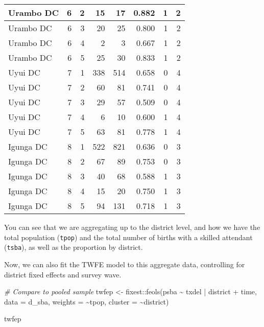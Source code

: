 \documentclass[
]{article}
\newenvironment{Shaded}{\begin{snugshade}}{\end{snugshade}}
\newcommand{\AttributeTok}[1]{\textcolor[rgb]{0.77,0.63,0.00}{#1}}
\newcommand{\CommentTok}[1]{\textcolor[rgb]{0.56,0.35,0.01}{\textit{#1}}}
\newcommand{\FunctionTok}[1]{\textcolor[rgb]{0.00,0.00,0.00}{#1}}
\newcommand{\NormalTok}[1]{#1}
\newcommand{\OtherTok}[1]{\textcolor[rgb]{0.56,0.35,0.01}{#1}}
\newcommand{\SpecialCharTok}[1]{\textcolor[rgb]{0.00,0.00,0.00}{#1}}
\begin{document}
\begin{table}
\begin{tabular}[t]{l|r|r|r|r|r|r|r}
\hline
Urambo DC & 6 & 2 & 15 & 17 & 0.882 & 1 & 2\\
\hline
Urambo DC & 6 & 3 & 20 & 25 & 0.800 & 1 & 2\\
\hline
Urambo DC & 6 & 4 & 2 & 3 & 0.667 & 1 & 2\\
\hline
Urambo DC & 6 & 5 & 25 & 30 & 0.833 & 1 & 2\\
\hline
Uyui DC & 7 & 1 & 338 & 514 & 0.658 & 0 & 4\\
\hline
Uyui DC & 7 & 2 & 60 & 81 & 0.741 & 0 & 4\\
\hline
Uyui DC & 7 & 3 & 29 & 57 & 0.509 & 0 & 4\\
\hline
Uyui DC & 7 & 4 & 6 & 10 & 0.600 & 1 & 4\\
\hline
Uyui DC & 7 & 5 & 63 & 81 & 0.778 & 1 & 4\\
\hline
Igunga DC & 8 & 1 & 522 & 821 & 0.636 & 0 & 3\\
\hline
Igunga DC & 8 & 2 & 67 & 89 & 0.753 & 0 & 3\\
\hline
Igunga DC & 8 & 3 & 40 & 68 & 0.588 & 1 & 3\\
\hline
Igunga DC & 8 & 4 & 15 & 20 & 0.750 & 1 & 3\\
\hline
Igunga DC & 8 & 5 & 94 & 131 & 0.718 & 1 & 3\\
\hline
\end{tabular}
\end{table}

You can see that we are aggregating up to the district level, and how we
have the total population (\texttt{tpop}) and the total number of births
with a skilled attendant (\texttt{tsba}), as well as the proportion by
district.

Now, we can also fit the TWFE model to this aggregate data, controlling
for district fixed effects and survey wave.

\begin{Shaded}
\begin{Highlighting}[]
\CommentTok{\# Compare to pooled sample}
\NormalTok{twfep }\OtherTok{\textless{}{-}}\NormalTok{ fixest}\SpecialCharTok{::}\FunctionTok{feols}\NormalTok{(psba }\SpecialCharTok{\textasciitilde{}}\NormalTok{ txdel }\SpecialCharTok{|}\NormalTok{ district }\SpecialCharTok{+}\NormalTok{ time, }
                      \AttributeTok{data =}\NormalTok{ d\_sba,}
                      \AttributeTok{weights =} \SpecialCharTok{\textasciitilde{}}\NormalTok{tpop, }
                      \AttributeTok{cluster =} \SpecialCharTok{\textasciitilde{}}\NormalTok{district)}

\NormalTok{twfep}
\end{Highlighting}
\end{Shaded}
\end{document}
